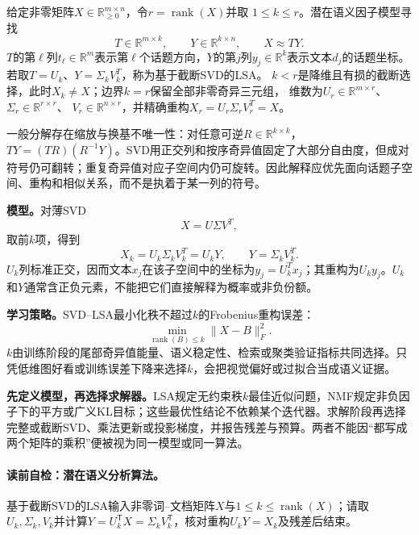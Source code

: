 \begin{definition}[潜在语义因子模型]\label{def:V4-C05-lsa}
给定非零矩阵$X\in\mathbb R_{\ge0}^{m\times n}$，令$r=\operatorname{rank}(X)$并取
$1\le k\le r$。潜在语义因子模型寻找
\[
T\in\mathbb R^{m\times k},\qquad
Y\in\mathbb R^{k\times n},\qquad X\approx TY.
\]
$T$的第$\ell$列$t_\ell\in\mathbb R^m$表示第$\ell$个话题方向，$Y$的第$j$列$y_j\in\mathbb R^k$表示文本$d_j$的话题坐标。若取$T=U_k$、$Y=\Sigma_kV_k^T$，称为基于截断SVD的LSA。
$k<r$是降维且有损的截断选择，此时$X_k\ne X$；边界$k=r$保留全部非零奇异三元组，
维数为$U_r\in\mathbb R^{m\times r}$、$\Sigma_r\in\mathbb R^{r\times r}$、
$V_r\in\mathbb R^{n\times r}$，并精确重构$X_r=U_r\Sigma_rV_r^T=X$。
\end{definition}

一般分解存在缩放与换基不唯一性：对任意可逆$R\in\mathbb R^{k\times k}$，
$TY=(TR)(R^{-1}Y)$。SVD用正交列和按序奇异值固定了大部分自由度，但成对符号仍可翻转；重复奇异值对应子空间内仍可旋转。因此解释应优先面向话题子空间、重构和相似关系，而不是执着于某一列的符号。

\label{struct:V4-C05-CH08}
\textbf{模型。}对薄SVD
\[
X=U\Sigma V^T,
\]
取前$k$项，得到
\[
X_k=U_k\Sigma_kV_k^T=U_kY,
\qquad Y=\Sigma_kV_k^T.
\]
$U_k$列标准正交，因而文本$x_j$在该子空间中的坐标为$y_j=U_k^Tx_j$；其重构为$U_ky_j$。$U_k$和$Y$通常含正负元素，不能把它们直接解释为概率或非负份额。

\label{struct:V4-C05-CH09}
\textbf{学习策略。}SVD--LSA最小化秩不超过$k$的Frobenius重构误差：
\[
\min_{\operatorname{rank}(B)\le k}\|X-B\|_F^2.
\]
$k$由训练阶段的尾部奇异值能量、语义稳定性、检索或聚类验证指标共同选择。只凭低维图好看或训练误差下降来选择$k$，会把视觉偏好或过拟合当成语义证据。

\label{struct:V4-C05-CH10}
\textbf{先定义模型，再选择求解器。}LSA规定无约束秩$k$最佳近似问题，NMF规定非负因子下的平方或广义KL目标；这些最优性结论不依赖某个迭代器。求解阶段再选择完整或截断SVD、乘法更新或投影梯度，并报告残差与预算。两者不能因“都写成两个矩阵的乘积”便被视为同一模型或同一算法。

\paragraph{读前自检：潜在语义分析算法。}基于截断SVD的LSA输入非零词--文档矩阵$X$与$1\le k\le\operatorname{rank}(X)$；请取$U_k,\Sigma_k,V_k$并计算$Y=U_k^{\mathsf T}X=\Sigma_kV_k^{\mathsf T}$，核对重构$U_kY=X_k$及残差后结束。\par
